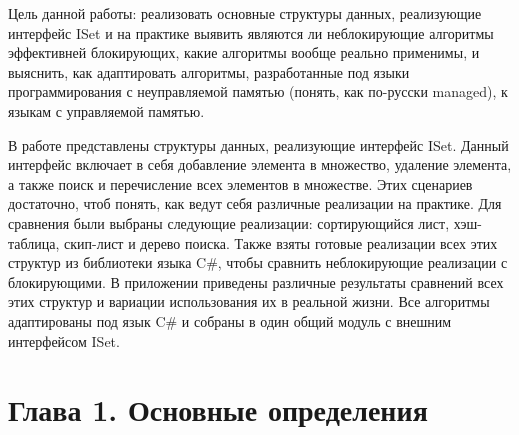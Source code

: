 \documentclass[12pt]{article}
\begin{document}
{			\par Цель данной работы: реализовать основные структуры данных, реализующие интерфейс ISet и на практике выявить являются ли неблокирующие алгоритмы эффективней блокирующих, какие алгоритмы вообще реально применимы, и выяснить, как адаптировать алгоритмы, разработанные под языки программирования с неуправляемой памятью (понять, как по-русски managed), к языкам с управляемой памятью.
			\par В работе представлены структуры данных, реализующие интерфейс ISet. Данный интерфейс включает в себя добавление элемента в множество, удаление элемента, а также поиск и перечисление всех элементов в множестве. Этих сценариев достаточно, чтоб понять, как ведут себя различные реализации на практике. Для сравнения были выбраны следующие реализации: сортирующийся лист, хэш-таблица, скип-лист и дерево поиска. Также взяты готовые реализации всех этих структур из библиотеки языка C\#, чтобы сравнить неблокирующие реализации с блокирующими. В приложении приведены различные результаты сравнений всех этих структур и вариации использования их в реальной жизни. Все алгоритмы адаптированы под язык C\# и собраны в один общий модуль с внешним интерфейсом ISet.
		
		\newpage
		
		\section{Глава 1. Основные определения}
}
\end{document}
